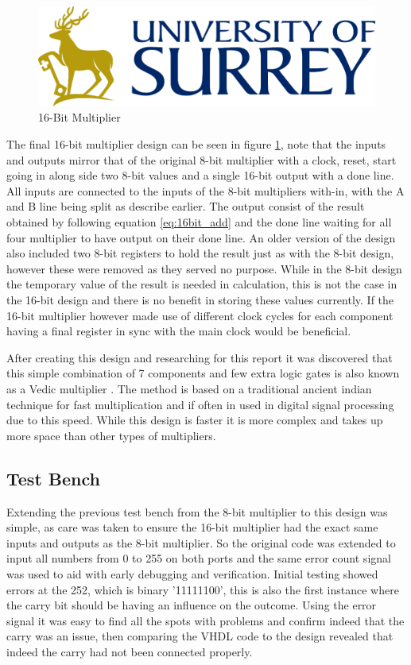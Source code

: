 \documentclass[11pt]{article}
\begin{document}
\begin{figure}[H]         
    \centering
    \includegraphics[width=\textwidth]{Logo.png}
    \caption{16-Bit Multiplier}
    \label{fig:8bit}
\end{figure} 

The final 16-bit multiplier design can be seen in figure \ref{fig:8bit},
note that the inputs and outputs mirror that of the original 8-bit multiplier with a clock, reset, start going in along side two 8-bit values and a single 16-bit output with a done line.
All inputs are connected to the inputs of the 8-bit multipliers with-in, with the A and B line being split as describe earlier. 
The output consist of the result obtained by following equation \ref{eq:16bit_add} and the done line waiting for all four multiplier to have output on their done line.
An older version of the design also included two 8-bit registers to hold the result just as with the 8-bit design, however these were removed as they served no purpose.
While in the 8-bit design the temporary value of the result is needed in calculation, this is not the case in the 16-bit design and there is no benefit in storing these values currently.
If the 16-bit multiplier however made use of different clock cycles for each component having a final register in sync with the main clock would be beneficial.

After creating this design and researching for this report it was discovered that this simple combination of 7 components and few extra logic gates is also known as a Vedic multiplier \cite{vedic}.
The method is based on a traditional ancient indian technique for fast multiplication and if often in used in digital signal processing due to this speed.
While this design is faster it is more complex and takes up more space than other types of multipliers.

\subsection{Test Bench}
Extending the previous test bench from the 8-bit multiplier to this design was simple,
as care was taken to ensure the 16-bit multiplier had the exact same inputs and outputs as the 8-bit multiplier.
So the original code was extended to input all numbers from 0 to 255 on both ports and the same error count signal was used to aid with early debugging and verification.
Initial testing showed errors at the 252, which is binary '11111100', this is also the first instance where the carry bit should be having an influence on the outcome.
Using the error signal it was easy to find all the spots with problems and confirm indeed that the carry was an issue,
then comparing the VHDL code to the design revealed that indeed the carry had not been connected properly.
\end{document}
